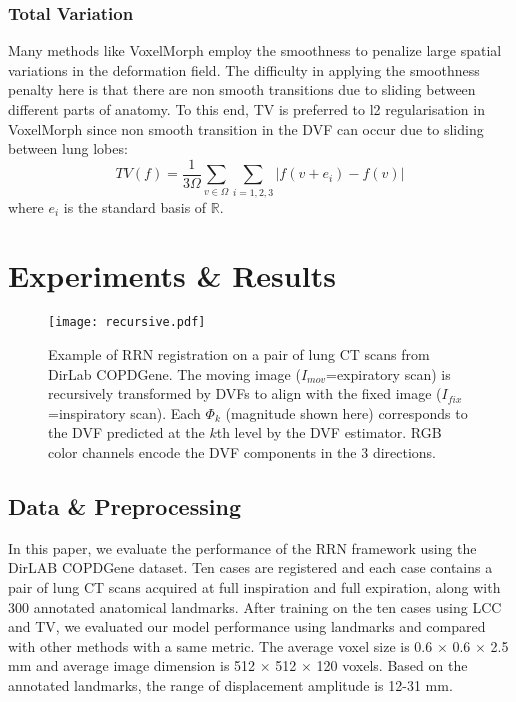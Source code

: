 \documentclass[runningheads]{llncs}
\begin{document}
\subsubsection{Total Variation}
Many methods like VoxelMorph employ the smoothness to penalize large spatial variations in the deformation field. The difficulty in applying the smoothness penalty here is that there are non smooth transitions due to sliding between different parts of anatomy. To this end, TV is preferred to l2 regularisation in VoxelMorph since non smooth transition in the DVF can occur due to sliding between lung lobes:
\begin{equation}
TV(f) = \frac{1}{3 \Omega} \sum_{v\in \Omega} \sum_{i = 1,2,3} |f(v+e_i)-f(v)|
\end{equation}
where $e_i$ is the standard basis of $\mathbb{R}$. 





\section{Experiments \& Results}
\begin{figure}[t]
\texttt{[image: recursive.pdf]}
\caption{Example of RRN registration on a pair of lung CT scans from DirLab COPDGene. The moving image ($I_{mov}$=expiratory scan) is recursively transformed by DVFs to align with the fixed image ($I_{fix}$=inspiratory scan). Each $\Phi_k$ (magnitude shown here) corresponds to the DVF predicted at the $k$th level by the DVF estimator. RGB color channels encode the DVF components in the 3 directions.}\label{fig3}
\end{figure}

\subsection{Data \& Preprocessing}
In this paper, we evaluate the performance of the RRN framework using the DirLAB COPDGene dataset. Ten cases are registered and each case contains a pair of lung CT scans acquired at full inspiration and full expiration, along with 300 annotated anatomical landmarks. After training on the ten cases using LCC and TV, we evaluated our model performance using landmarks and compared with other methods with a same metric. The average voxel size is 0.6 $\times$ 0.6 $\times$ 2.5 mm and average image dimension is 512 $\times$ 512 $\times$ 120 voxels. Based on the annotated landmarks, the range of displacement amplitude is 12-31 mm.
\end{document}
